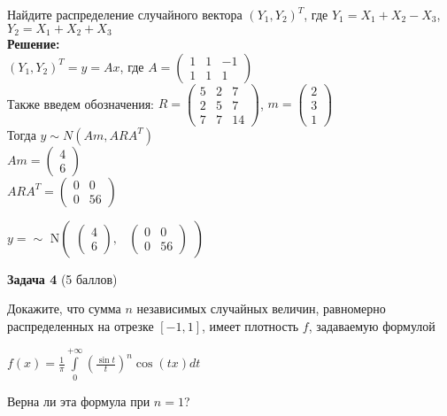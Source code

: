 \documentclass{article}
\begin{document}
Найдите распределение случайного вектора $(Y_1, Y_2)^T$, где $Y_1 = X_1 + X_2 - X_3$, $Y_2 = X_1 + X_2 + X_3$\\

\textbf{Решение:}\\
$(Y_1, Y_2)^T = y = Ax$, где 
$A = \begin{pmatrix}
1 & 1 & -1 \\ 1 & 1 & 1
\end{pmatrix}$\\
Также введем обозначения:
$R = \begin{pmatrix}
5 & 2 & 7 \\ 2 & 5 & 7 \\ 7 & 7 & 14
\end{pmatrix}$, 
$m = \begin{pmatrix}
2 \\ 3 \\ 1
\end{pmatrix}$\\
Тогда $y \sim N(Am, ARA^T)$\\
$Am = \begin{pmatrix}
4\\6
\end{pmatrix}$\\
$ARA^T = \begin{pmatrix}
0 & 0 \\ 0 & 56
\end{pmatrix}$\\
\begin{center}
$y = \sim$
$\mathrm{N} \begin{pmatrix}
\begin{pmatrix}
4 \\ 6
\end{pmatrix}, &
\begin{pmatrix}
0 & 0 \\ 0 & 56
\end{pmatrix}    
\end{pmatrix}$    
\end{center}

\textbf{Задача 4} (5 баллов)

Докажите, что сумма $n$ независимых случайных величин, равномерно 
распределенных на отрезке $[-1, 1]$, имеет плотность $f$, задаваемую формулой

\begin{center}
    

$f(x) = \frac{1}{\pi}  \int\limits_{0}^{+\infty} \left(\frac{\sin t}{t} \right)^n \cos(tx) dt$

\end{center}
Верна ли эта формула при $n = 1$?\\
\end{document}
